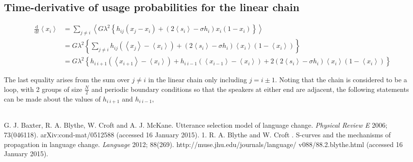 \documentclass[12pt]{article}
\begin{document}
\newpage
\subsection{Time-derivative of usage probabilities for the linear chain}

\begin{align*}
\frac{\mathrm d}{\mathrm dt} \left\langle x_i \right\rangle &= \sum\limits_{j \neq i}  \left\langle G \lambda^{2} \left\lbrace h_{ij} \left(x_j - x_i \right)  + \left( 2\left\langle s_i \right\rangle - \sigma h_i \right) x_i \left(1-x_i  \right) \right\rbrace \right\rangle \\
&=  G \lambda^{2} \left\lbrace \sum\limits_{j \neq i} h_{ij} \left( \left\langle x_j \right\rangle -  \left\langle x_i \right\rangle \right)  + \left( 2\left\langle s_i \right\rangle - \sigma h_i \right) \left\langle x_i \right\rangle \left(1- \left\langle x_i \right\rangle \right) \right\rbrace \\
&= G \lambda^{2} \left\lbrace  h_{i \ i+1} \left( \left\langle x_{i+1} \right\rangle -  \left\langle x_i \right\rangle \right) + h_{i \ i-1} \left( \left\langle x_{i-1} \right\rangle -  \left\langle x_i \right\rangle \right)  + 2 \left( 2\left\langle s_i \right\rangle - \sigma h_i \right) \left\langle x_i \right\rangle \left(1- \left\langle x_i \right\rangle \right) \right\rbrace
\end{align*}

The last equality arises from the sum over $j \neq i$ in the linear chain only including $j = i \pm 1$. Noting that the chain is considered to be a loop, with 2 groups of size $\frac{N}{2}$ and periodic boundary conditions so that the speakers at either end are adjacent, the following statements can be made about the values of $h_{i \ i+1}$ and $h_{i \ i-1}$,
\begin{equation}

\end{equation}

\begin{align*}
\end{align*}






\newpage
\begin{thebibliography}{99}
 	G. J. Baxter, R. A. Blythe, W. Croft and A. J. McKane. Utterance selection model of language change. \emph{Physical Review E} 2006; 73(046118). arXiv:cond-mat/0512588 (accessed 16 January 2015).
 1.	R. A. Blythe and W. Croft . S-curves and the mechanisms of propagation in language change. \emph{Language} 2012; 88(269). http://muse.jhu.edu/journals/language/ v088/88.2.blythe.html (accessed 16 January 2015).
\end{thebibliography}
\end{document}
